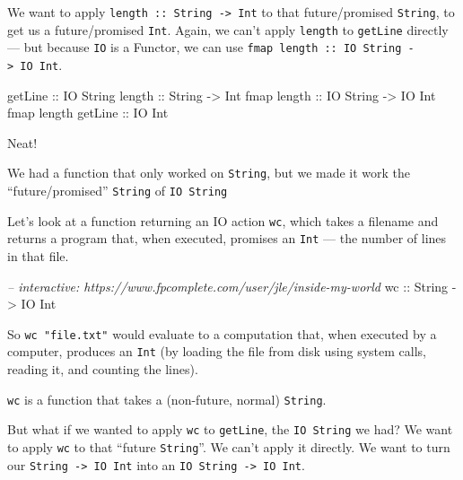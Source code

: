 \documentclass[]{article}
\newenvironment{Shaded}{}{}
\newcommand{\DataTypeTok}[1]{\textcolor[rgb]{0.56,0.13,0.00}{{#1}}}
\newcommand{\CommentTok}[1]{\textcolor[rgb]{0.38,0.63,0.69}{\textit{{#1}}}}
\newcommand{\OtherTok}[1]{\textcolor[rgb]{0.00,0.44,0.13}{{#1}}}
\newcommand{\NormalTok}[1]{{#1}}
\begin{document}
We want to apply \texttt{length\ ::\ String\ -\textgreater{}\ Int} to
that future/promised \texttt{String}, to get us a future/promised
\texttt{Int}. Again, we can't apply \texttt{length} to \texttt{getLine}
directly --- but because \texttt{IO} is a Functor, we can use
\texttt{fmap\ length\ ::\ IO\ String\ -\textgreater{}\ IO\ Int}.

\begin{Shaded}
\begin{Highlighting}[]
\NormalTok{getLine}\OtherTok{             ::} \DataTypeTok{IO} \DataTypeTok{String}
\NormalTok{length}\OtherTok{              ::} \DataTypeTok{String} \OtherTok{->} \DataTypeTok{Int}
\NormalTok{fmap}\OtherTok{ length         ::} \DataTypeTok{IO} \DataTypeTok{String} \OtherTok{->} \DataTypeTok{IO} \DataTypeTok{Int}
\NormalTok{fmap length}\OtherTok{ getLine ::} \DataTypeTok{IO} \DataTypeTok{Int}
\end{Highlighting}
\end{Shaded}

Neat!

We had a function that only worked on \texttt{String}, but we made it
work the ``future/promised'' \texttt{String} of \texttt{IO\ String}

Let's look at a function returning an IO action \texttt{wc}, which takes
a filename and returns a program that, when executed, promises an
\texttt{Int} --- the number of lines in that file.

\begin{Shaded}
\begin{Highlighting}[]
\CommentTok{-- interactive: https://www.fpcomplete.com/user/jle/inside-my-world}
\OtherTok{wc ::} \DataTypeTok{String} \OtherTok{->} \DataTypeTok{IO} \DataTypeTok{Int}
\end{Highlighting}
\end{Shaded}

So \texttt{wc\ "file.txt"} would evaluate to a computation that, when
executed by a computer, produces an \texttt{Int} (by loading the file
from disk using system calls, reading it, and counting the lines).

\texttt{wc} is a function that takes a (non-future, normal)
\texttt{String}.

But what if we wanted to apply \texttt{wc} to \texttt{getLine}, the
\texttt{IO\ String} we had? We want to apply \texttt{wc} to that
``future \texttt{String}''. We can't apply it directly. We want to turn
our \texttt{String\ -\textgreater{}\ IO\ Int} into an
\texttt{IO\ String\ -\textgreater{}\ IO\ Int}.
\end{document}
